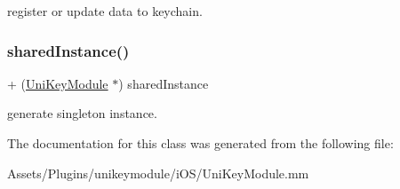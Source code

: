 register or update data to keychain. \mbox{\label{interface_uni_key_module_a32a8491c21919320c2b88f1252aad3c9}} 
\subsubsection{\texorpdfstring{shared\+Instance()}{sharedInstance()}}
{\footnotesize\ttfamily + (\mbox{\hyperlink{interface_uni_key_module}{Uni\+Key\+Module}} $\ast$) shared\+Instance \begin{DoxyParamCaption}{ }\end{DoxyParamCaption}}

generate singleton instance. 

The documentation for this class was generated from the following file\+:\begin{DoxyCompactItemize}
\item 
Assets/\+Plugins/unikeymodule/i\+O\+S/Uni\+Key\+Module.\+mm\end{DoxyCompactItemize}
